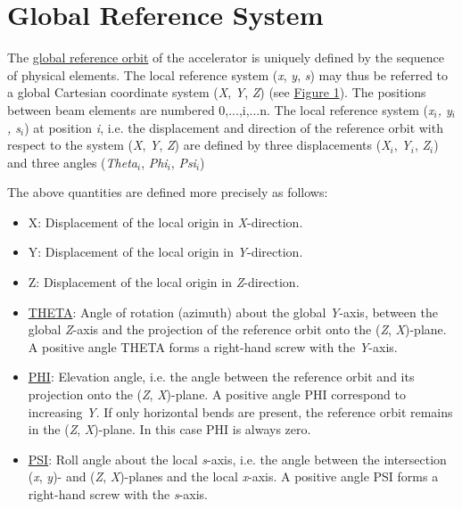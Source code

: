 
\section{Global Reference System}

The \hyperlink{global}{global reference orbit} of the accelerator is
uniquely defined by the sequence of physical elements. The local
reference system (\textit{x}, \textit{y}, \textit{s}) may thus be
referred to a global Cartesian coordinate system (\textit{X},
\textit{Y}, \textit{Z}) (see \hyperlink{global}{Figure 1}). The
positions between beam elements are numbered 0,...,i,...n. The local
reference system  (\textit{x$_i$, y$_i$, s$_i$}) at position \textit{i},
i.e. the displacement and direction of the reference orbit with respect
to the system (\textit{X}, \textit{Y}, \textit{Z}) are defined by three
displacements  (\textit{X$_i$}, \textit{Y$_i$}, \textit{Z$_i$}) and
three angles (\textit{Theta$_i$}, \textit{Phi$_i$}, \textit{Psi$_i$})

The above quantities are defined more precisely as follows:  
\begin{itemize}
   \item X: Displacement of the local origin in \textit{X}-direction. 
   \item Y: Displacement of the local origin in \textit{Y}-direction. 
   \item Z: Displacement of the local origin in \textit{Z}-direction. 
   \item \href{theta}{THETA}: Angle of rotation (azimuth) about the
     global \textit{Y}-axis, between the global \textit{Z}-axis and the
     projection of the reference orbit onto the (\textit{Z},
     \textit{X})-plane. A positive angle THETA forms a right-hand screw
     with the \textit{Y}-axis. 
   \item \href{phi}{PHI}: Elevation angle, i.e. the angle between the
     reference orbit and its projection onto the (\textit{Z},
     \textit{X})-plane. A positive angle PHI correspond to increasing
     \textit{Y}. If only horizontal bends are present, the reference
     orbit remains in the (\textit{Z}, \textit{X})-plane. In this case
     PHI is always zero. 
   \item \href{psi}{PSI}: Roll angle about the local \textit{s}-axis,
     i.e. the angle between the intersection (\textit{x}, \textit{y})-
     and (\textit{Z}, \textit{X})-planes and the local
     \textit{x}-axis. A positive angle PSI forms a right-hand screw with
     the \textit{s}-axis. 
\end{itemize} 

